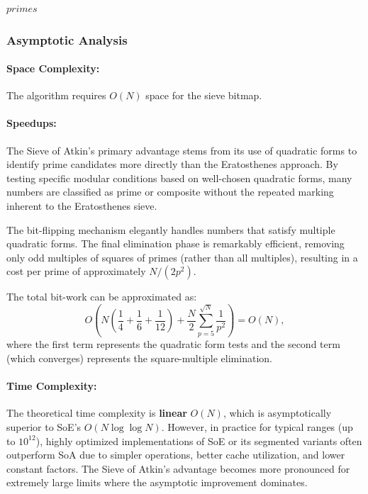 \documentclass{article}
\begin{document}
\begin{breakablealgorithm}
\begin{algorithmic}[1]
        \State {}
                \State {}
            \EndIf
        \EndFor

        \State \Return $primes$ 
    \end{algorithmic}
\end{breakablealgorithm}

\subsubsection*{Asymptotic Analysis}

\paragraph{Space Complexity:} The algorithm requires $O(N)$ space for the sieve bitmap.

\paragraph{Speedups:} 
The Sieve of Atkin's primary advantage stems from its use of quadratic forms to identify prime candidates more directly than the Eratosthenes approach. By testing specific modular conditions based on well-chosen quadratic forms, many numbers are classified as prime or composite without the repeated marking inherent to the Eratosthenes sieve.

The bit-flipping mechanism elegantly handles numbers that satisfy multiple quadratic forms. The final elimination phase is remarkably efficient, removing only odd multiples of squares of primes (rather than all multiples), resulting in a cost per prime of approximately $N/(2p^2)$.

The total bit-work can be approximated as:
\[
O\left(N\left(\frac{1}{4} + \frac{1}{6} + \frac{1}{12}\right) + \frac{N}{2}\sum_{p=5}^{\sqrt N}\frac{1}{p^2}\right) = O(N),
\]
where the first term represents the quadratic form tests and the second term (which converges) represents the square-multiple elimination.

\paragraph{Time Complexity:} The theoretical time complexity is \textbf{linear} $O(N)$, which is asymptotically superior to SoE's $O(N \log \log N)$. However, in practice for typical ranges (up to $10^{12}$), highly optimized implementations of SoE or its segmented variants often outperform SoA due to simpler operations, better cache utilization, and lower constant factors. The Sieve of Atkin's advantage becomes more pronounced for extremely large limits where the asymptotic improvement dominates.
\end{document}
